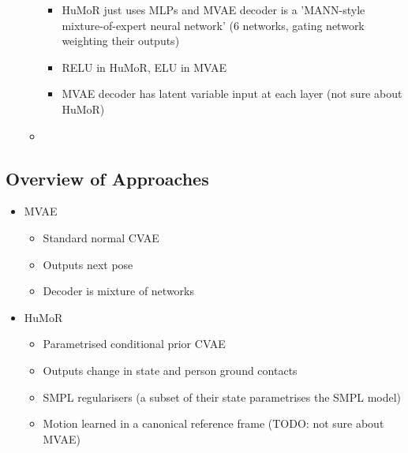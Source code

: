 \begin{itemize}
\begin{itemize}
        \begin{itemize}
            \item HuMoR just uses MLPs and MVAE decoder is a 'MANN-style mixture-of-expert neural network' (6 networks, gating network weighting their outputs)
            \item RELU in HuMoR, ELU in MVAE
            \item MVAE decoder has latent variable input at each layer (not sure about HuMoR)
        \end{itemize}
        \item 
    \end{itemize}
\end{itemize}


\subsection{Overview of Approaches}
\begin{itemize}
    \item MVAE \cite{humor}
    \begin{itemize}
        \item Standard normal CVAE
        \item Outputs next pose
        \item Decoder is mixture of networks
    \end{itemize}
    \item HuMoR \cite{humor}
    \begin{itemize}
        \item Parametrised conditional prior CVAE
        \item Outputs change in state and person ground contacts
        \item SMPL regularisers (a subset of their state parametrises the SMPL model)
        \item Motion learned in a canonical reference frame (TODO: not sure about MVAE)
    \end{itemize}
\end{itemize}


